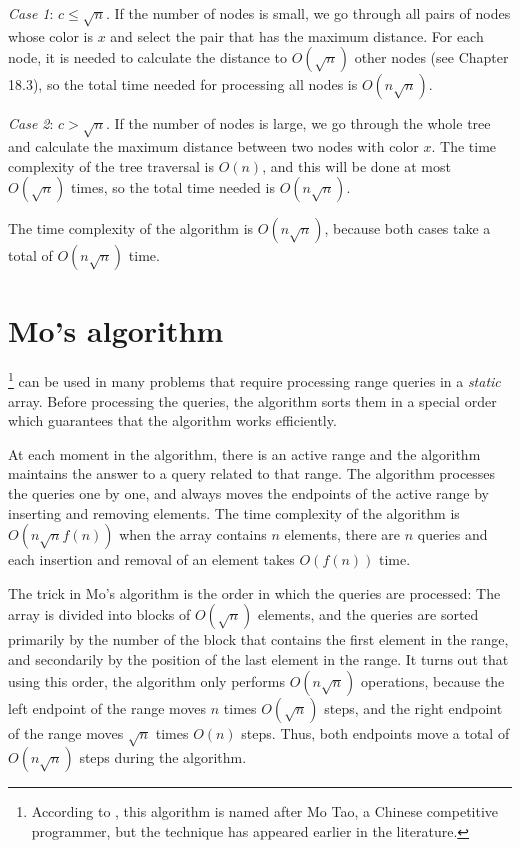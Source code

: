 \emph{Case 1}: $c \le \sqrt n$.
If the number of nodes is small,
we go through all pairs of nodes whose
color is $x$ and select the pair that
has the maximum distance.
For each node, it is needed to calculate the distance
to $O(\sqrt n)$ other nodes (see Chapter 18.3),
so the total time needed for processing all
nodes is $O(n \sqrt n)$.

\emph{Case 2}: $c > \sqrt n$.
If the number of nodes is large,
we go through the whole tree
and calculate the maximum distance between
two nodes with color $x$.
The time complexity of the tree traversal is $O(n)$,
and this will be done at most $O(\sqrt n)$ times,
so the total time needed is $O(n \sqrt n)$.

The time complexity of the algorithm is $O(n \sqrt n)$,
because both cases take a total of $O(n \sqrt n)$ time.

\section{Mo's algorithm}


\footnote{According to \cite{cod15}, this algorithm
is named after Mo Tao, a Chinese competitive programmer, but
the technique has appeared earlier in the literature.} can be used in many problems
that require processing range queries in 
a \emph{static} array.
Before processing the queries, the algorithm
sorts them in a special order which guarantees
that the algorithm works efficiently.

At each moment in the algorithm, there is an active
range and the algorithm maintains the answer
to a query related to that range.
The algorithm processes the queries one by one,
and always moves the endpoints of the
active range by inserting and removing elements.
The time complexity of the algorithm is
$O(n \sqrt n f(n))$ when the array contains
$n$ elements, there are $n$ queries
and each insertion and removal of an element
takes $O(f(n))$ time.

The trick in Mo's algorithm is the order
in which the queries are processed:
The array is divided into blocks of $O(\sqrt n)$
elements, and the queries are sorted primarily by
the number of the block that contains the first element
in the range, and secondarily by the position of the
last element in the range.
It turns out that using this order, the algorithm
only performs $O(n \sqrt n)$ operations,
because the left endpoint of the range moves
$n$ times $O(\sqrt n)$ steps,
and the right endpoint of the range moves
$\sqrt n$ times $O(n)$ steps. Thus, both
endpoints move a total of $O(n \sqrt n)$ steps during the algorithm.

